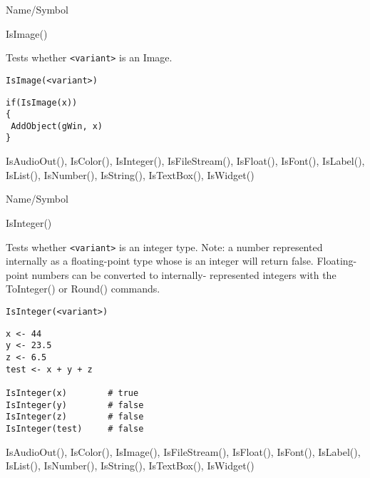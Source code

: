 \begin{desc}{Name/Symbol}
\item[Name/Symbol]	IsImage()

\item[Description]	Tests whether \verb+<variant>+ is an Image.

\item[Usage]
\begin{verbatim}
IsImage(<variant>)
\end{verbatim}

\item[Example]	
\begin{verbatim}
if(IsImage(x))
{
 AddObject(gWin, x)
}
\end{verbatim}

\item[See Also]	IsAudioOut(), IsColor(), IsInteger(), IsFileStream(), 
		IsFloat(), IsFont(), IsLabel(), IsList(), IsNumber(), 
		IsString(), IsTextBox(), IsWidget()
\end{desc}

\rl




\begin{desc}{Name/Symbol}
\item[Name/Symbol]	IsInteger()

\item[Description]	Tests whether \verb+<variant>+ is an integer type.  
		Note: a number represented internally as a floating-point
	     	type whose is an integer will return false.  
	Floating-point numbers can be converted to internally- 
	represented integers with the ToInteger() or Round() commands.
 
\item[Usage]		
\begin{verbatim}
IsInteger(<variant>)
\end{verbatim}

\item[Example]
\begin{verbatim}
x <- 44
y <- 23.5
z <- 6.5
test <- x + y + z 
	
IsInteger(x)		# true
IsInteger(y)		# false
IsInteger(z)		# false
IsInteger(test)		# false
\end{verbatim}

\item[See Also]	IsAudioOut(), IsColor(), IsImage(), IsFileStream(), 
	IsFloat(), IsFont(), IsLabel(), IsList(), IsNumber(), 
	IsString(), IsTextBox(), IsWidget()
\end{desc}

